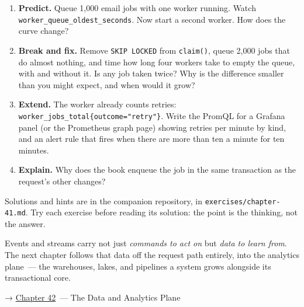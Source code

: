 \begin{enumerate}
\def\labelenumi{\arabic{enumi}.}
\tightlist
\item
  \textbf{Predict.} Queue 1,000 email jobs with one worker running. Watch \texttt{worker\_}\allowbreak{}\texttt{queue\_}\allowbreak{}\texttt{oldest\_}\allowbreak{}\texttt{seconds}. Now start a second worker. How does the curve change?
\item
  \textbf{Break and fix.} Remove \texttt{SKIP\ LOCKED} from \texttt{claim()}, queue 2,000 jobs that do almost nothing, and time how long four workers take to empty the queue, with and without it. Is any job taken twice? Why is the difference smaller than you might expect, and when would it grow?
\item
  \textbf{Extend.} The worker already counts retries: \texttt{worker\_}\allowbreak{}\texttt{jobs\_}\allowbreak{}\texttt{total\{outcome=}\allowbreak{}\texttt{"retry"\}}. Write the PromQL for a Grafana panel (or the Prometheus graph page) showing retries per minute by kind, and an alert rule that fires when there are more than ten a minute for ten minutes.
\item
  \textbf{Explain.} Why does the book enqueue the job in the same transaction as the request's other changes?
\end{enumerate}

\noindent{}Solutions and hints are in the companion repository, in \texttt{exercises/}\allowbreak{}\texttt{chapter-41.md}. Try each exercise before reading its solution: the point is the thinking, not the answer.

\label{41-event-driven-architecture:whats-next}

Events and streams carry not just \emph{commands to act on} but \emph{data to learn from}. The next chapter follows that data off the request path entirely, into the analytics plane~--- the warehouses, lakes, and pipelines a system grows alongside its transactional core.

\noindent{}→ \hyperref[ch:42-data-analytics-plane]{Chapter 42}~--- The Data and Analytics Plane
